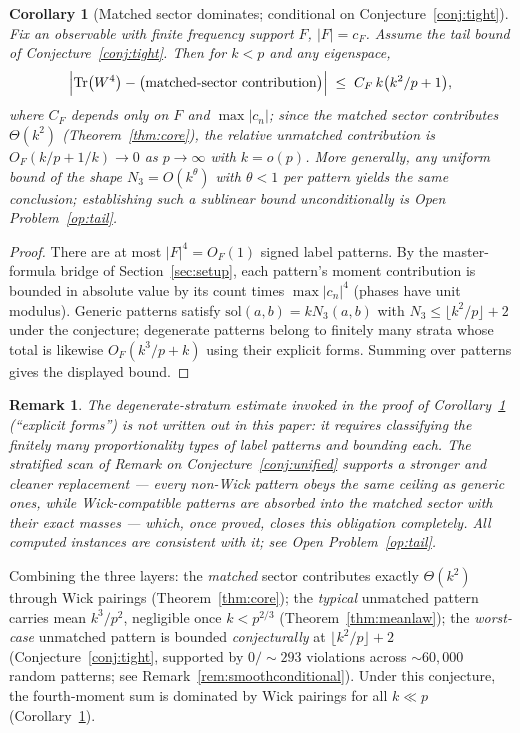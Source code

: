 \documentclass[11pt]{article}
\newtheorem{corollary}[theorem]{Corollary}
\newtheorem{remark}[theorem]{Remark}
\begin{document}
\begin{corollary}[Matched sector dominates;
conditional on Conjecture~\ref{conj:tight}]\label{cor:domination}
Fix an observable with finite frequency support $F$, $|F|=c_F$. Assume
the tail bound of Conjecture~\ref{conj:tight}. Then for $k<p$ and any
eigenspace,
\[
\Bigl|\operatorname{Tr}\bigl(W^{4}\bigr)
-\bigl(\text{matched-sector contribution}\bigr)\Bigr|
\;\le\;
C_{F}\,k\bigl(k^{2}/p+1\bigr),
\]
where $C_F$ depends only on $F$ and $\max|c_n|$; since the matched
sector contributes $\Theta(k^2)$ (Theorem~\ref{thm:core}), the
relative unmatched contribution is
$O_F(k/p+1/k)\to0$ as $p\to\infty$ with $k=o(p)$.
More generally, \emph{any} uniform bound of the shape
$N_3=O(k^{\theta})$ with $\theta<1$ per pattern yields the same
conclusion; establishing such a sublinear bound unconditionally is
Open Problem~\ref{op:tail}.
\end{corollary}

\begin{proof}
There are at most $|F|^{4}=O_F(1)$ signed label patterns. By the
master-formula bridge of Section~\ref{sec:setup}, each pattern's
moment contribution is bounded in absolute value by its count times
$\max|c_n|^4$ (phases have unit modulus). Generic patterns satisfy
$\mathrm{sol}(a,b)=kN_3(a,b)$ with $N_3\le\lfloor k^2/p\rfloor+2$
under the conjecture; degenerate patterns belong
to finitely many strata whose total is likewise
$O_F(k^{3}/p+k)$ using their explicit forms. Summing over patterns gives
the displayed bound.
\end{proof}

\begin{remark}
The degenerate-stratum estimate invoked in the proof of
Corollary~\ref{cor:domination} (``explicit forms'') is not written out
in this paper: it requires classifying the finitely many
proportionality types of label patterns and bounding each.  The
stratified scan of Remark on Conjecture~\ref{conj:unified} supports a
stronger and cleaner replacement --- every non-Wick pattern obeys the
same ceiling as generic ones, while Wick-compatible patterns are
absorbed into the matched sector with their exact masses --- which,
once proved, closes this obligation completely.  All computed
instances are consistent with it; see Open Problem~\ref{op:tail}.
\end{remark}

Combining the three layers:
the \emph{matched} sector contributes exactly $\Theta(k^2)$ through
Wick pairings (Theorem~\ref{thm:core}); the \emph{typical} unmatched
pattern carries mean $k^3/p^2$, negligible once $k<p^{2/3}$
(Theorem~\ref{thm:meanlaw}); the \emph{worst-case} unmatched pattern
is bounded \emph{conjecturally} at
$\lfloor k^2/p\rfloor+2$ (Conjecture~\ref{conj:tight}, supported by
$0/\sim 293$ violations across $\sim 60{,}000$ random patterns; see
Remark~\ref{rem:smoothconditional}).  Under this conjecture, the
fourth-moment sum is dominated by Wick pairings for all
$k \ll p$ (Corollary~\ref{cor:domination}).
\end{document}
